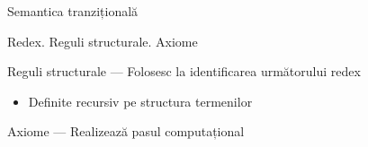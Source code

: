 \documentclass[handout,xcolor=pdftex,romanian,colorlinks]{beamer}
\begin{document}
\begin{section}{Semantica tranzițională}
\begin{frame}{Redex. Reguli structurale. Axiome}
\begin{block}{Reguli structurale --- Folosesc la identificarea următorului redex}
\begin{itemize}
\item Definite recursiv pe structura termenilor
\end{itemize}
\end{block}
\begin{block}{Axiome --- Realizează pasul computațional}
\end{block}
\end{frame}
\end{section}
\end{document}
